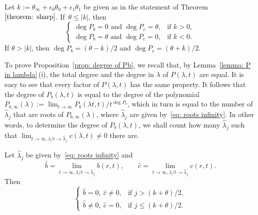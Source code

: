 \begin{Proposition} \label{prop: degree of Pb}
 Let $k:=\theta_\infty+\epsilon_0\theta_0+\epsilon_1\theta_1$ be
 given as in the statement of Theorem~$\ref{theorem: sharp}$.
 If~$\theta\le|k|$, then
\[
 \begin{cases}
 \deg P_b=0\text{ and }\deg P_c=\theta, &\text{if }k>0, \\
 \deg P_b=\theta\text{ and }\deg P_c=0, &\text{if }k<0.
 \end{cases}
\]
 If $\theta>|k|$, then $\deg P_b=(\theta-k)/2$ and $\deg
 P_c=(\theta+k)/2$.
\end{Proposition}

To prove Proposition~\ref{prop: degree of Pb}, we recall that, by
Lemma~\ref{lemma: P in lambda}\,(i), the total degree and the degree in
$\lambda$ of $P(\lambda,t)$ are equal. It is easy to see that every
factor of $P(\lambda,t)$ has the same property. It follows that the
degree of $P_b(\lambda,t)$ is equal to the degree of the polynomial
$P_{b,\infty}(\lambda):=\lim_{t\to\infty}P_b(\lambda t,t)/t^{\deg
 P_b}$, which in turn is equal to the number of $\hat\lambda_j$ that
are roots of $P_{b,\infty}(\lambda)$, where $\hat\lambda_j$ are given
by~\eqref{eq: roots infinity}. In other words, to determine the degree
of $P_b(\lambda,t)$, we shall count how many $\hat\lambda_j$ such that
$\lim_{t\to\infty,\lambda/t\to\hat\lambda_j}c(\lambda,t)\neq 0$ there
are.

\begin{Lemma}\label{lem-111} Let $\hat\lambda_j$ be given by~\eqref{eq: roots
 infinity} and
\[
 \hat b=\lim_{t\to\infty,\lambda/t\to\hat\lambda_j}b(r,t), \qquad
 \hat c=\lim_{t\to\infty,\lambda/t\to\hat\lambda_j}c(r,t).
\]
 Then
\[
 \begin{cases}
 \hat b=0,~\hat c\neq 0, & \text{if }j>(k+\theta)/2, \\
 \hat b\neq0,~\hat c=0, &\text{if }j\le(k+\theta)/2.
 \end{cases}
\]
\end{Lemma}

